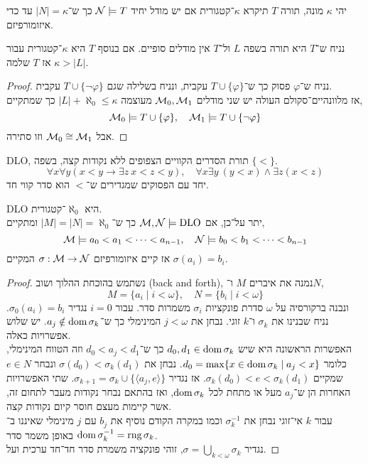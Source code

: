\begin{definition}[קטגוריות]
	יהי $\kappa$ מונה, תורה $T$ תיקרא $\kappa$־קטגורית אם יש מודל יחיד $\mathcal{N} \models T$ כך ש־$|N| = \kappa$ עד כדי איזומורפיזם.
\end{definition}
\begin{theorem}
	נניח ש־$T$ היא תורה בשפה $L$ ול־$T$ אין מודלים סופיים.
	אם בנוסף $T$ היא $\kappa$־קטגורית עבור $\kappa > |L|$ אז $T$ שלמה.
\end{theorem}
\begin{proof}
	נניח ש־$\varphi$ פסוק כך ש־$T \cup \{ \varphi \}$ עקבית, ונניח בשלילה שגם $T \cup \{ \lnot \varphi \}$ עקבית. \\
	אז מלוונהיים־סקולם העולה יש שני מודלים $\mathcal{M}_0, \mathcal{M}_1$ מעוצמה $|L| + \aleph_0 \le \kappa$ כך שמתקיים,
	\[
		\mathcal{M}_0 \models T \cup \{ \varphi \},
		\quad
		\mathcal{M}_1 \models T \cup \{ \lnot \varphi \}
	\]
	אבל $\mathcal{M}_0 \cong \mathcal{M}_1$ וזו סתירה.
\end{proof}
\begin{example}
	DLO, תורת הסדרים הקוויים הצפופים ללא נקודות קצה, בשפה $\{ < \}$.
	\[
		\forall x \forall y (x < y \to \exists z\ x < z < y),
		\quad
		\forall x \exists y\ (y < x) \land \exists z (x < z)
	\]
	יחד עם הפסוקים שמגדירים ש־$<$ הוא סדר קווי חד.
\end{example}
\begin{theorem}[קנטור]
	DLO היא $\aleph_0$־קטגורית. \\
	יתר על־כן, אם $\mathcal{M}, \mathcal{N} \models \operatorname{DLO}$ כך ש־$|M| = |N| = \aleph_0$ ומתקיים,
	\[
		\mathcal{M} \models a_0 < a_1 < \cdots < a_{n - 1},
		\quad
		\mathcal{N} \models b_0 < b_1 < \cdots < b_{n - 1}
	\]
	אז קיים איזומורפיזם $\sigma : \mathcal{M} \to \mathcal{N}$ המקיים $\sigma(a_i) = b_i$.
\end{theorem}
\begin{proof}
	נשתמש בהוכחת ההלוך ושוב (back and forth), נמנה את איברים $M$ ו־$N$,
	\[
		M = \{ a_i \mid i < \omega \},
		\quad
		N = \{ b_i \mid i < \omega \}
	\]
	ונבנה ברקורסיה על $\omega$ סדרת פונקציות $\sigma_i$ משמרות סדר.
	עבור $i = 0$ נגדיר $\sigma_0(a_i) = b_i$.
	נניח שבנינו את $\sigma_k$ ו־$k$ זוגי.
	נבחן את $j < \omega$ המינימלי כך ש־$a_j \notin \operatorname{dom} \sigma_k$.
	יש שלוש אפשרויות כאלה. \\
	האפשרות הראשונה היא שיש $d_0, d_1 \in \operatorname{dom} \sigma_k$ כך ש־$d_0 < a_j < d_1$ וזה הטווח המינימלי, כלומר $d_0 = \max\{ x \in \operatorname{dom} \sigma_k \mid a_j < x \}$.
	נבחן את $\sigma(d_0) < \sigma_k(d_1)$ ונבחר $e \in N$ שמקיים $\sigma_k(d_0) < e < \sigma_k(d_1)$.
	אז נגדיר $\sigma_{k + 1} = \sigma_k \cup \{ \langle a_j, e \rangle \}$.
	שתי האפשרויות האחרות הן ש־$a_j$ מעל או מתחת לכל $\operatorname{dom} \sigma_k$, ואז בהתאם נבחר נקודות מעבר לתחום זה, אשר קיימות מעצם חוסר קיום נקודות קצה. \\
	עבור $k$ אי־זוגי נבחן את $\sigma_k^{-1}$ וכמו במקרה הקודם נוסיף את $b_j$ עם $j$ מינימלי שאיננו ב־$\operatorname{dom} \sigma_k^{-1} = \operatorname{rng} \sigma_k$ באופן משמר סדר. \\
	נגדיר $\sigma = \bigcup_{k < \omega} \sigma_k$, זוהי פונקציה משמרת סדר חד־חד ערכית ועל.
\end{proof}

